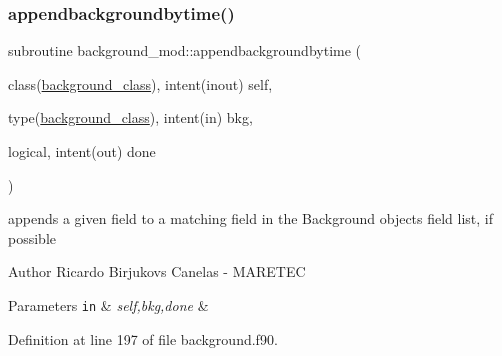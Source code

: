 \subsubsection{\texorpdfstring{appendbackgroundbytime()}{appendbackgroundbytime()}}
{\footnotesize\ttfamily subroutine background\+\_\+mod\+::appendbackgroundbytime (\begin{DoxyParamCaption}\item[{class(\mbox{\hyperlink{structbackground__mod_1_1background__class}{background\+\_\+class}}), intent(inout)}]{self,  }\item[{type(\mbox{\hyperlink{structbackground__mod_1_1background__class}{background\+\_\+class}}), intent(in)}]{bkg,  }\item[{logical, intent(out)}]{done }\end{DoxyParamCaption})\hspace{0.3cm}{\ttfamily [private]}}



appends a given field to a matching field in the Background object\textquotesingle{}s field list, if possible 

\begin{DoxyAuthor}{Author}
Ricardo Birjukovs Canelas -\/ M\+A\+R\+E\+T\+EC 
\end{DoxyAuthor}

\begin{DoxyParams}[1]{Parameters}
\mbox{\tt in}  & {\em self,bkg,done} & \\
\hline
\end{DoxyParams}


Definition at line 197 of file background.\+f90.


